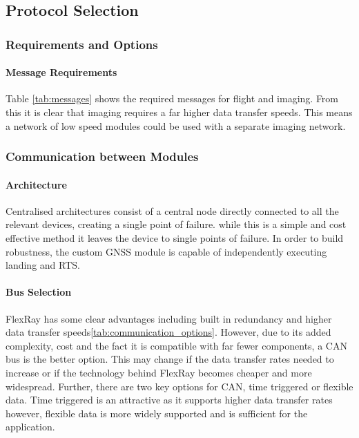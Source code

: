 \subsection{Protocol Selection}

\subsubsection{Requirements and Options}
\paragraph{Message Requirements}
Table \ref{tab:messages} shows the required messages for flight and imaging. From this it is clear that imaging requires a far higher data transfer speeds. This means a network of low speed modules could be used with a separate imaging network.



\subsubsection{Communication between Modules}
\paragraph{Architecture}
Centralised architectures consist of a central node directly connected to all the relevant devices, creating a single point of failure. while this is a simple and cost effective method it leaves the device to single points of failure. In order to build robustness, the custom \gls{GNSS} module is capable of independently executing landing and \gls{RTS}.  
\paragraph{Bus Selection}
FlexRay has some clear advantages including built in redundancy and higher data transfer speeds\ref{tab:communication_options}. However, due to its added complexity, cost and the fact it is compatible with far fewer components, a \gls{CAN} bus is the better option. This may change if the data transfer rates needed to increase or if the technology behind FlexRay becomes cheaper and more widespread. Further, there are two key options for \gls{CAN}, time triggered or flexible data. Time triggered is an attractive as it supports higher data transfer rates however, flexible data is more widely supported and is sufficient for the application.\cite{CANFlexRay}
 
